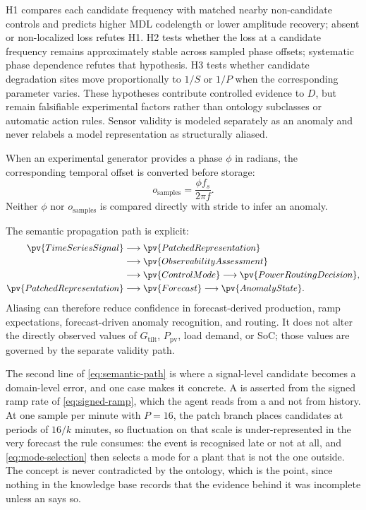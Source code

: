 H1 compares each candidate frequency with matched nearby non-candidate controls and predicts higher MDL codelength or lower amplitude recovery; absent or non-localized loss refutes H1. H2 tests whether the loss at a candidate frequency remains approximately stable across sampled phase offsets; systematic phase dependence refutes that hypothesis. H3 tests whether candidate degradation sites move proportionally to $1/S$ or $1/P$ when the corresponding parameter varies. These hypotheses contribute controlled evidence to $D$, but remain falsifiable experimental factors rather than ontology subclasses or automatic action rules. Sensor validity is modeled separately as an anomaly and never relabels a model representation as structurally aliased.

When an experimental generator provides a phase $\phi$ in radians, the corresponding temporal offset is converted before storage:
\begin{equation*}
o_{\mathrm{samples}}=\frac{\phi f_s}{2\pi f}.
\end{equation*}
Neither $\phi$ nor $o_{\mathrm{samples}}$ is compared directly with stride to infer an anomaly.

The semantic propagation path is explicit:
\begin{equation}
\begin{aligned}
\pv{TimeSeriesSignal}
&\longrightarrow \pv{PatchedRepresentation}\\
&\longrightarrow \pv{ObservabilityAssessment}\\
&\longrightarrow \pv{ControlMode}
\longrightarrow \pv{PowerRoutingDecision},\\
\pv{PatchedRepresentation}
&\longrightarrow \pv{Forecast}
\longrightarrow \pv{AnomalyState}.
\end{aligned}
\label{eq:semantic-path}
\end{equation}
Aliasing can therefore reduce confidence in forecast-derived production, ramp expectations, forecast-driven anomaly recognition, and routing. It does not alter the directly observed values of $G_{\mathrm{tilt}}$, $P_{\mathrm{pv}}$, load demand, or SoC; those values are governed by the separate validity path.

The second line of \autoref{eq:semantic-path} is where a signal-level candidate becomes a domain-level error, and one case makes it concrete. A  is asserted from the signed ramp rate of \autoref{eq:signed-ramp}, which the agent reads from a  and not from history. At one sample per minute with $P=16$, the patch branch places candidates at periods of $16/k$ minutes, so fluctuation on that scale is under-represented in the very forecast the rule consumes: the event is recognised late or not at all, and \autoref{eq:mode-selection} then selects a mode for a plant that is not the one outside. The concept is never contradicted by the ontology, which is the point, since nothing in the knowledge base records that the evidence behind it was incomplete unless an  says so.

